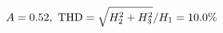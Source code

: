 \documentclass[preview]{standalone}
\begin{document}
\begin{align*}
\special{dvisvgm:raw <g id='unique000'>}A=0.52,\ \text{THD}=\sqrt{H_2^2+H_3^2}/H_1=10.0\%\special{dvisvgm:raw </g>}
\end{align*}
\end{document}
